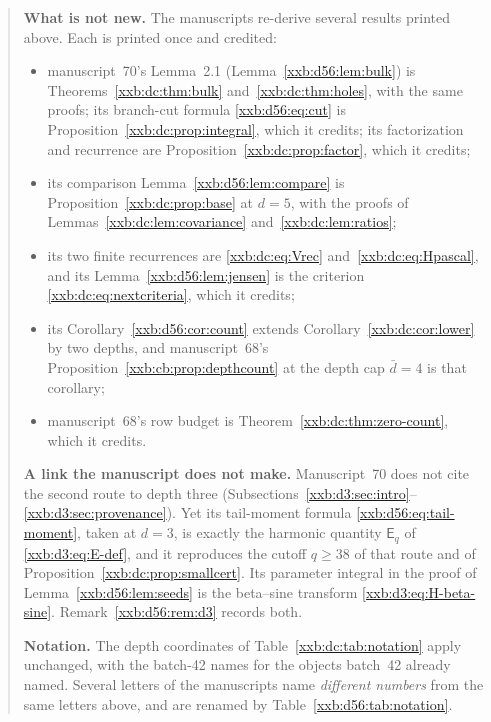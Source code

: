 \documentclass[11pt,a4paper]{article}
\numberwithin{equation}{section}
\theoremstyle{definition}
\theoremstyle{remark}
\theoremstyle{plain}
\begin{document}
\begin{quote}
\smallskip
\textbf{What is not new.}  The manuscripts re-derive several results printed
above.  Each is printed once and credited:
\begin{itemize}[leftmargin=1.4em,itemsep=1pt]
\item manuscript~70's Lemma~2.1 (Lemma~\ref{xxb:d56:lem:bulk}) is
 Theorems~\ref{xxb:dc:thm:bulk} and~\ref{xxb:dc:thm:holes}, with the same
 proofs; its branch-cut formula \eqref{xxb:d56:eq:cut} is
 Proposition~\ref{xxb:dc:prop:integral}, which it credits; its
 factorization and recurrence are Proposition~\ref{xxb:dc:prop:factor}, which
 it credits;
\item its comparison Lemma~\ref{xxb:d56:lem:compare} is
 Proposition~\ref{xxb:dc:prop:base} at $d=5$, with the proofs of
 Lemmas~\ref{xxb:dc:lem:covariance} and~\ref{xxb:dc:lem:ratios};
\item its two finite recurrences are \eqref{xxb:dc:eq:Vrec}
 and~\eqref{xxb:dc:eq:Hpascal}, and its Lemma~\ref{xxb:d56:lem:jensen} is the
 criterion \eqref{xxb:dc:eq:nextcriteria}, which it credits;
\item its Corollary~\ref{xxb:d56:cor:count} extends
 Corollary~\ref{xxb:dc:cor:lower} by two depths, and manuscript~68's
 Proposition~\ref{xxb:cb:prop:depthcount} at the depth cap $\bar d=4$ is that
 corollary;
\item manuscript~68's row budget is Theorem~\ref{xxb:dc:thm:zero-count}, which
 it credits.
\end{itemize}

\smallskip
\textbf{A link the manuscript does not make.}  Manuscript~70 does not cite the
second route to depth three
(Subsections~\ref{xxb:d3:sec:intro}--\ref{xxb:d3:sec:provenance}).  Yet its
tail-moment formula \eqref{xxb:d56:eq:tail-moment}, taken at $d=3$, is exactly
the harmonic quantity $\mathsf E_q$ of \eqref{xxb:d3:eq:E-def}, and it
reproduces the cutoff $q\ge38$ of that route and of
Proposition~\ref{xxb:dc:prop:smallcert}.  Its parameter integral in the proof
of Lemma~\ref{xxb:d56:lem:seeds} is the beta--sine transform
\eqref{xxb:d3:eq:H-beta-sine}.  Remark~\ref{xxb:d56:rem:d3} records both.

\smallskip
\textbf{Notation.}  The depth coordinates of
Table~\ref{xxb:dc:tab:notation} apply unchanged, with the batch-42 names for
the objects batch~42 already named.  Several letters of the manuscripts name
\emph{different numbers} from the same letters above, and are renamed by
Table~\ref{xxb:d56:tab:notation}.
\end{quote}
\end{document}
